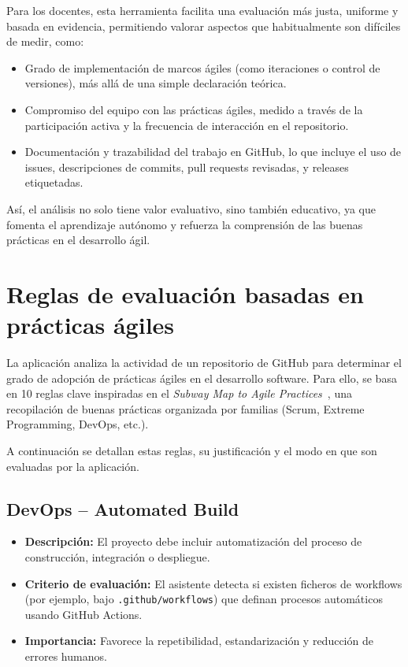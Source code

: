Para los docentes, esta herramienta facilita una evaluación más justa, uniforme y basada en evidencia, permitiendo valorar aspectos que habitualmente son difíciles de medir, como:

\begin{itemize}
\item Grado de implementación de marcos ágiles (como iteraciones o control de versiones), más allá de una simple declaración teórica.
\item Compromiso del equipo con las prácticas ágiles, medido a través de la participación activa y la frecuencia de interacción en el repositorio.
\item Documentación y trazabilidad del trabajo en GitHub, lo que incluye el uso de issues, descripciones de commits, pull requests revisadas, y releases etiquetadas.
\end{itemize}

Así, el análisis no solo tiene valor evaluativo, sino también educativo, ya que fomenta el aprendizaje autónomo y refuerza la comprensión de las buenas prácticas en el desarrollo ágil.

\section{Reglas de evaluación basadas en prácticas ágiles}

La aplicación analiza la actividad de un repositorio de GitHub para determinar el grado de adopción de prácticas ágiles en el desarrollo software. Para ello, se basa en 10 reglas clave inspiradas en el \textit{Subway Map to Agile Practices}~\cite{agileSubwayMap}, una recopilación de buenas prácticas organizada por familias (Scrum, Extreme Programming, DevOps, etc.).

A continuación se detallan estas reglas, su justificación y el modo en que son evaluadas por la aplicación.

\subsection{DevOps – Automated Build}

\begin{itemize}
  \item \textbf{Descripción:} El proyecto debe incluir automatización del proceso de construcción, integración o despliegue.
  \item \textbf{Criterio de evaluación:} El asistente detecta si existen ficheros de workflows (por ejemplo, bajo \texttt{.github/workflows}) que definan procesos automáticos usando GitHub Actions.
  \item \textbf{Importancia:} Favorece la repetibilidad, estandarización y reducción de errores humanos.
\end{itemize}

